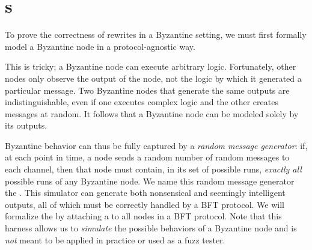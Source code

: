 \section{\randomSimulator{}s}
\label{sec:bft-formalism}
To prove the correctness of rewrites in a Byzantine setting, we must first formally model a Byzantine node in a protocol-agnostic way.

This is tricky; a Byzantine node can execute arbitrary logic.
Fortunately, other nodes only observe the output of the node, not the logic by which it generated a particular message.
Two Byzantine nodes that generate the same outputs are indistinguishable, even if one executes complex logic and the other creates messages at random.
It follows that a Byzantine node can be modeled solely by its outputs.

Byzantine behavior can thus be fully captured by a \emph{random message generator}: if, at each point in time, a node sends a random number of random messages to each channel, then that node must contain, in its set of possible runs, \emph{exactly all} possible runs of any Byzantine node.
We name this random message generator the \textbf{\randomSimulator{}}.
This simulator can generate both nonsensical and seemingly intelligent outputs, all of which must be correctly handled by a BFT protocol.
We will formalize the \randomSimulator{} by attaching a \textbf{\randomHarness{}} to all nodes in a BFT protocol.
Note that this harness allows us to \emph{simulate} the possible behaviors of a Byzantine node and is \emph{not} meant to be applied in practice or used as a fuzz tester.

